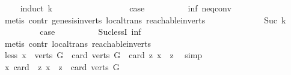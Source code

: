 \begin{isabellebody}
\ \ \ \ \isamarkupfalse%
{\isacharparenleft}{\kern0pt}induct\ k{\isacharparenright}{\kern0pt}\isanewline
\ \ \ \ \ \ \isamarkupfalse%
\ {}\isanewline
\ \ \ \ \ \ \isamarkupfalse%
\ \isamarkupfalse%
\ {\isacharquery}{\kern0pt}case\isanewline
\ \ \ \ \ \ \ \ \isamarkupfalse%
\ inf\ neq{}{\isacharunderscore}{\kern0pt}conv\isanewline
\ \ \ \ \ \ \ \ \isamarkupfalse%
\ {\isacharparenleft}{\kern0pt}metis\ contr\ genesis{\isacharunderscore}{\kern0pt}in{\isacharunderscore}{\kern0pt}verts\ local{\isachardot}{\kern0pt}trans\ reachable{}{\isacharunderscore}{\kern0pt}in{\isacharunderscore}{\kern0pt}verts{\isacharparenleft}{\kern0pt}{}{\isacharparenright}{\kern0pt}{\isacharparenright}{\kern0pt}\ \isanewline
\ \ \ \ \isamarkupfalse%
\isanewline
\ \ \ \ \ \ \isamarkupfalse%
\ {\isacharparenleft}{\kern0pt}Suc\ k{\isacharparenright}{\kern0pt}\isanewline
\ \ \ \ \ \ \isamarkupfalse%
\ \isamarkupfalse%
\ {\isacharquery}{\kern0pt}case\isanewline
\ \ \ \ \ \ \ \ \isamarkupfalse%
\ Suc{\isacharunderscore}{\kern0pt}lessI\ inf\isanewline
\ \ \ \ \ \ \ \ \isamarkupfalse%
\ {\isacharparenleft}{\kern0pt}metis\ contr\ local{\isachardot}{\kern0pt}trans\ reachable{}{\isacharunderscore}{\kern0pt}in{\isacharunderscore}{\kern0pt}verts{\isacharparenleft}{\kern0pt}{}{\isacharparenright}{\kern0pt}{\isacharparenright}{\kern0pt}\ \isanewline
\ \ \ \ \isamarkupfalse%
\isanewline
\ \ \isamarkupfalse%
\isanewline
\ \ \isamarkupfalse%
\ \isamarkupfalse%
\ less{\isacharcolon}{\kern0pt}\ {\isachardoublequoteopen}{\isasymexists}x\ {\isasymin}\ verts\ G{\isachardot}{\kern0pt}\ \ card\ {\isacharparenleft}{\kern0pt}verts\ G{\isacharparenright}{\kern0pt}\ {\isacharless}{\kern0pt}\ card\ {\isacharbraceleft}{\kern0pt}z{\isachardot}{\kern0pt}\ x\ {\isasymrightarrow}\isactrlsup {\isacharplus}{\kern0pt}\ z{\isacharbraceright}{\kern0pt}{\isachardoublequoteclose}\ \isamarkupfalse%
\ simp\isanewline
\ \ \isamarkupfalse%
\isanewline
\ \ \isamarkupfalse%
\ {\isachardoublequoteopen}{\isasymforall}x{\isachardot}{\kern0pt}\ card\ \ {\isacharbraceleft}{\kern0pt}z{\isachardot}{\kern0pt}\ x\ {\isasymrightarrow}\isactrlsup {\isacharplus}{\kern0pt}\ z{\isacharbraceright}{\kern0pt}\ {\isasymle}\ card\ {\isacharparenleft}{\kern0pt}verts\ G{\isacharparenright}{\kern0pt}{\isachardoublequoteclose}\isanewline

\end{isabellebody}
